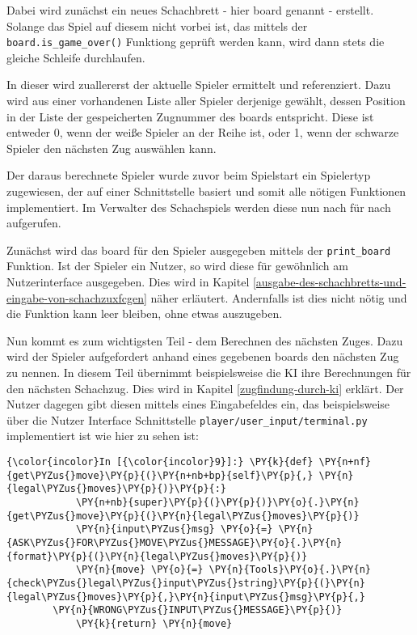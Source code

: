     Dabei wird zunächst ein neues Schachbrett - hier board genannt -
erstellt. Solange das Spiel auf diesem nicht vorbei ist, das mittels der
\texttt{board.is\_game\_over()} Funktiong geprüft werden kann, wird dann
stets die gleiche Schleife durchlaufen.

In dieser wird zuallererst der aktuelle Spieler ermittelt und
referenziert. Dazu wird aus einer vorhandenen Liste aller Spieler
derjenige gewählt, dessen Position in der Liste der gespeicherten
Zugnummer des boards entspricht. Diese ist entweder 0, wenn der weiße
Spieler an der Reihe ist, oder 1, wenn der schwarze Spieler den nächsten
Zug auswählen kann.

Der daraus berechnete Spieler wurde zuvor beim Spielstart ein Spielertyp
zugewiesen, der auf einer Schnittstelle basiert und somit alle nötigen
Funktionen implementiert. Im Verwalter des Schachspiels werden diese nun nach für nach aufgerufen.

Zunächst wird das board für den Spieler ausgegeben mittels der
\texttt{print\_board} Funktion. Ist der Spieler ein Nutzer, so wird
diese für gewöhnlich am Nutzerinterface ausgegeben. Dies wird in Kapitel
\ref{ausgabe-des-schachbretts-und-eingabe-von-schachzuxfcgen} näher erläutert. Andernfalls ist dies nicht nötig und die
Funktion kann leer bleiben, ohne etwas auszugeben.

Nun kommt es zum wichtigsten Teil - dem Berechnen des nächsten Zuges.
Dazu wird der Spieler aufgefordert anhand eines gegebenen boards den
nächsten Zug zu nennen. In diesem Teil übernimmt beispielsweise die KI
ihre Berechnungen für den nächsten Schachzug. Dies wird in Kapitel
\ref{zugfindung-durch-ki} erklärt. Der Nutzer dagegen gibt diesen mittels eines
Eingabefeldes ein, das beispielsweise über die Nutzer Interface
Schnittstelle \texttt{player/user\_input/terminal.py} implementiert ist
wie hier zu sehen ist:

    \begin{Verbatim}[commandchars=\\\{\}]
{\color{incolor}In [{\color{incolor}9}]:} \PY{k}{def} \PY{n+nf}{get\PYZus{}move}\PY{p}{(}\PY{n+nb+bp}{self}\PY{p}{,} \PY{n}{legal\PYZus{}moves}\PY{p}{)}\PY{p}{:}
            \PY{n+nb}{super}\PY{p}{(}\PY{p}{)}\PY{o}{.}\PY{n}{get\PYZus{}move}\PY{p}{(}\PY{n}{legal\PYZus{}moves}\PY{p}{)}
            \PY{n}{input\PYZus{}msg} \PY{o}{=} \PY{n}{ASK\PYZus{}FOR\PYZus{}MOVE\PYZus{}MESSAGE}\PY{o}{.}\PY{n}{format}\PY{p}{(}\PY{n}{legal\PYZus{}moves}\PY{p}{)}
            \PY{n}{move} \PY{o}{=} \PY{n}{Tools}\PY{o}{.}\PY{n}{check\PYZus{}legal\PYZus{}input\PYZus{}string}\PY{p}{(}\PY{n}{legal\PYZus{}moves}\PY{p}{,}\PY{n}{input\PYZus{}msg}\PY{p}{,} 
		\PY{n}{WRONG\PYZus{}INPUT\PYZus{}MESSAGE}\PY{p}{)}
            \PY{k}{return} \PY{n}{move}
\end{Verbatim}

